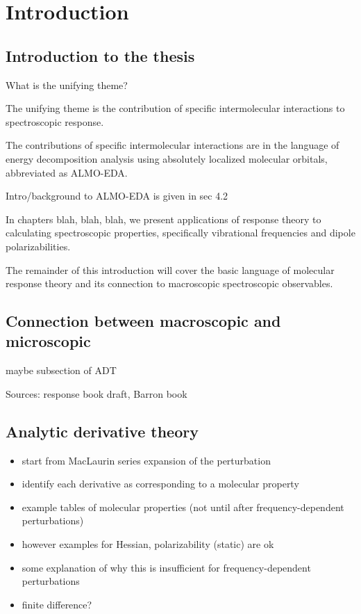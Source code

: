 \documentclass[%
class = book,%
crop = false,%
float = true,%
multi = true,%
preview = false,%
]{standalone}
\begin{document}
\chapter{Introduction}
\label{ch:introduction}

\section{Introduction to the thesis}
What is the unifying theme?

The unifying theme is the contribution of specific intermolecular interactions to spectroscopic response.

The contributions of specific intermolecular interactions are in the language of energy decomposition analysis using absolutely localized molecular orbitals, abbreviated as ALMO-EDA.

Intro/background to ALMO-EDA is given in sec 4.2

In chapters blah, blah, blah, we present applications of response theory to calculating spectroscopic properties, specifically vibrational frequencies and dipole polarizabilities.

The remainder of this introduction will cover the basic language of molecular response theory and its connection to macroscopic spectroscopic observables.

\section{Connection between macroscopic and microscopic}

maybe subsection of ADT

Sources: response book draft, Barron book

\section{Analytic derivative theory}

\begin{itemize}
\item start from MacLaurin series expansion of the perturbation
\item identify each derivative as corresponding to a molecular property
\item example tables of molecular properties (not until after frequency-dependent perturbations)
\item however examples for Hessian, polarizability (static) are ok
\item some explanation of why this is insufficient for frequency-dependent perturbations
\item finite difference?
\end{itemize}
\end{document}
